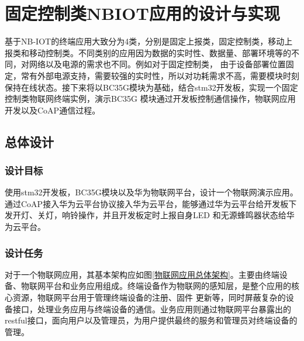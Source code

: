 



\chapter{固定控制类NBIOT应用的设计与实现}
基于NB-IOT的终端应用大致分为4类，分别是固定上报类，固定控制类，移动上报类和移动控制类。不同类别的应用因为数据的实时性、数据量、部署环境等的不同，对网络以及电源的需求也不同。例如对于固定控制类，
由于设备部署位置固定，常有外部电源支持，需要较强的实时性，所以对功耗需求不高，需要模块时刻保持在线状态。接下来将以BC35G模块为基础，结合stm32开发板，实现一个固定控制类物联网终端实例，演示BC35G
模块通过开发板控制通信操作，物联网应用开发以及CoAP通信过程。

\section{总体设计}

\subsection{设计目标}
使用stm32开发板，BC35G模块以及华为物联网平台，设计一个物联网演示应用。通过CoAP接入华为云平台协议接入华为云平台，能够通过华为云平台给开发板下发开灯、关灯，响铃操作，并且开发板定时上报自身LED
和无源蜂鸣器状态给华为云平台。

\subsection{设计任务}

对于一个物联网应用，其基本架构应如图\ref{物联网应用总体架构}。主要由终端设备、物联网平台和业务应用组成。终端设备作为物联网的感知层，是整个应用的核心资源，物联网平台用于管理终端设备的注册、固件
更新等，同时屏蔽复杂的设备接口，处理业务应用与终端设备的通信。业务应用则通过物联网平台暴露出的restful接口，面向用户以及管理员，为用户提供最终的服务和管理员对终端设备的管理。

